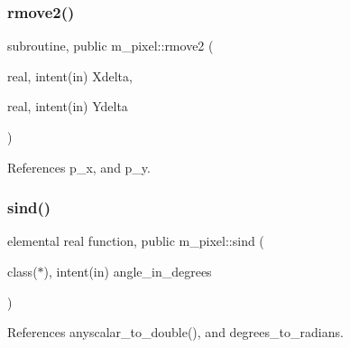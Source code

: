 \subsubsection{\texorpdfstring{rmove2()}{rmove2()}}
{\footnotesize\ttfamily subroutine, public m\+\_\+pixel\+::rmove2 (\begin{DoxyParamCaption}\item[{real, intent(in)}]{Xdelta,  }\item[{real, intent(in)}]{Ydelta }\end{DoxyParamCaption})}



References p\+\_\+x, and p\+\_\+y.

\mbox{\label{namespacem__pixel_a3ef23ce0230c47b30cb627ebd439daae}} 
\subsubsection{\texorpdfstring{sind()}{sind()}}
{\footnotesize\ttfamily elemental real function, public m\+\_\+pixel\+::sind (\begin{DoxyParamCaption}\item[{class($\ast$), intent(in)}]{angle\+\_\+in\+\_\+degrees }\end{DoxyParamCaption})}



References anyscalar\+\_\+to\+\_\+double(), and degrees\+\_\+to\+\_\+radians.

